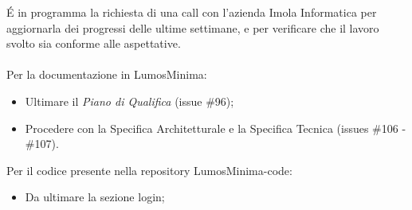 \documentclass[a4paper, 12pt]{article}
\begin{document}
\'E in programma la richiesta di una call con l'azienda Imola Informatica per aggiornarla dei progressi delle ultime settimane, e per verificare che il lavoro svolto sia conforme alle aspettative.\\ \\
Per la documentazione in LumosMinima:
\begin{itemize}
    \item Ultimare il \textit{Piano di Qualifica} (issue \#96);
    \item Procedere con la Specifica Architetturale e la Specifica Tecnica (issues \#106 - \#107).
\end{itemize}
\vspace*{0.5cm}
Per il codice presente nella repository LumosMinima-code:
\begin{itemize}
    \item Da ultimare la sezione login;
\end{itemize}
\end{document}
